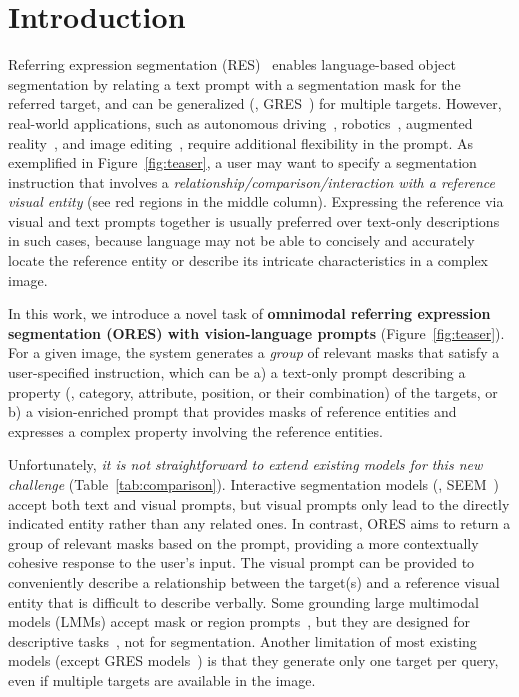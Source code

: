 \section{Introduction}
\label{sec:intro}

Referring expression segmentation (RES)~\cite{yu2016modeling, liu2023gres, hu2016segmentation} enables language-based object segmentation by relating a text prompt with a segmentation mask for the referred target, and can be generalized (\ie, GRES~\cite{liu2023gres}) for multiple targets.
However, real-world applications, such as autonomous driving~\cite{shao2024lmdrive,cui2024survey}, robotics~\cite{gao2024physically,liu2024vision, xu2024survey}, augmented reality~\cite{konenkov2024vr}, and image editing~\cite{shen2024empowering, nguyen2023visual,guo2024prompthis}, require additional flexibility in the prompt. As exemplified in Figure~\ref{fig:teaser}, a user may want to specify a segmentation instruction that involves a \emph{relationship/comparison/interaction with a reference visual entity} (see red regions in the middle column). Expressing the reference via visual and text prompts together is usually preferred over text-only descriptions in such cases, because language may not be able to concisely and accurately locate the reference entity or describe its intricate characteristics in a complex image.

In this work, we introduce a novel task of \textbf{omnimodal referring expression segmentation (ORES) with vision-language prompts} (Figure~\ref{fig:teaser}). For a given image, the system generates a \emph{group} of relevant masks that satisfy a user-specified instruction, which can be
a) a text-only prompt describing a property (\eg, category, attribute, position, or their combination) of the targets, or
b) a vision-enriched prompt that provides masks of reference entities and expresses a complex property involving the reference entities. 

Unfortunately, \emph{it is not straightforward to extend existing models for this new challenge} (Table~\ref{tab:comparison}).
Interactive segmentation models (\eg, SEEM~\cite{zou2024segment}) accept both text and visual prompts, but visual prompts only lead to the directly indicated entity rather than any related ones. In contrast, ORES aims to return a group of relevant masks based on the prompt, providing a more contextually cohesive response to the user's input. The visual prompt can be provided to conveniently describe a relationship between the target(s) and a reference visual entity that is difficult to describe verbally.
Some grounding large multimodal models (LMMs) accept mask or region prompts~\cite{you2024ferret, rasheed2024glamm, zhang2024groundhog}, but they are designed for descriptive tasks~\cite{chen2023shikra, zellers2019recognition}, not for segmentation.
Another limitation of most existing models (except GRES models~\cite{liu2023gres}) is that they generate only one target per query, even if multiple targets are available in the image.

